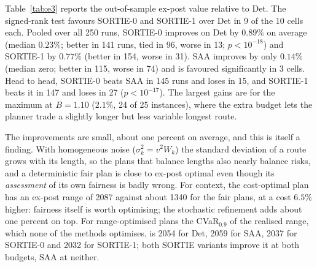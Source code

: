 \documentclass[11pt]{article}
\begin{document}
\begin{table}[t]\centering\small
\caption{E3: what each method believes its unfairness is, relative to the
true ex-post value (Monte Carlo without the day factor, which is what each
model represents), mean signed error over 50 runs per cell. Last column:
largest absolute error of the PBOI prediction for any method's plan.}\label{tab:illusion}

\end{table}

Table~\ref{tab:e3} reports the out-of-sample ex-post value relative to Det.
The signed-rank test favours SORTIE-0 and SORTIE-1 over Det in 9 of the 10
cells each. Pooled over all 250 runs, SORTIE-0 improves on Det by $0.89\%$ on
average (median $0.23\%$; better in 141 runs, tied in 96, worse in 13;
$p<10^{-18}$) and SORTIE-1 by $0.77\%$ (better in 154, worse in 31). SAA
improves by only $0.14\%$ (median zero; better in 115, worse in 74) and is
favoured significantly in 3 cells. Head to head, SORTIE-0 beats SAA in 145
runs and loses in 15, and SORTIE-1 beats it in 147 and loses in 27
($p<10^{-17}$). The largest gains are for the maximum at
$B=1.10$ ($2.1\%$, 24 of 25 instances), where the extra budget lets the
planner trade a slightly longer but less variable longest route.

The improvements are small, about one percent on average, and this is itself
a finding. With homogeneous
noise ($\sigma_k^2=v^2W_k$) the standard deviation of a route grows with its
length, so the plans that balance lengths also nearly balance risks, and a
deterministic fair plan is close to ex-post optimal even though its
\emph{assessment} of its own fairness is badly wrong. For context, the
cost-optimal plan has an ex-post range of 2087 against about 1340 for the fair
plans, at a cost $6.5\%$ higher: fairness itself is worth optimising; the
stochastic refinement adds about one percent on top. For range-optimised plans
the CVaR$_{0.9}$ of the realised range, which none of the methods optimises, is
2054 for Det, 2059 for SAA, 2037 for SORTIE-0 and 2032 for SORTIE-1; both
SORTIE variants improve it at both budgets, SAA at neither.

\begin{table}[t]\centering\small
\caption{E3: improvement of the out-of-sample ex-post value over Det (mean
\%, positive is better; in brackets the number of instances on which the
method is strictly better). $^\ast$: Wilcoxon signed-rank $p<0.05$ in favour
of the method; the test is on ranks and can disagree in sign with the mean
when one instance dominates (Var, $B=1.10$, SORTIE-1).}\label{tab:e3}

\end{table}
\end{document}
